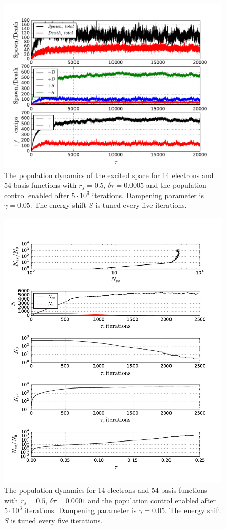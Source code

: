 \documentclass[twoside,english]{uiofysmaster}
\begin{document}
\begin{landscape}
	
	\begin{figure}[ht!]
		\centering
		\includegraphics[width=0.8\linewidth]{platFindStune}
		\caption{The population dynamics of the excited space for 14 electrons and 54 basis functions with $r_s=0.5$, $\delta \tau=0.0005$ and the population control enabled after $5\cdot 10^3$ iterations. Dampening parameter is $\gamma = 0.05$. The energy shift $S$ is tuned every five iterations.}
		\label{fig:platFindStune}
	\end{figure}
	
\end{landscape}



\begin{figure}[ht!]
	\centering
	\includegraphics[width=0.8\linewidth]{deathN0}
	\caption{The population dynamics for 14 electrons and 54 basis functions with $r_s=0.5$, $\delta \tau=0.0001$ and the population control enabled after $5\cdot 10^3$ iterations. Dampening parameter is $\gamma = 0.05$. The energy shift $S$ is tuned every five iterations.}
	\label{fig:deathN0}
\end{figure}
\end{document}
